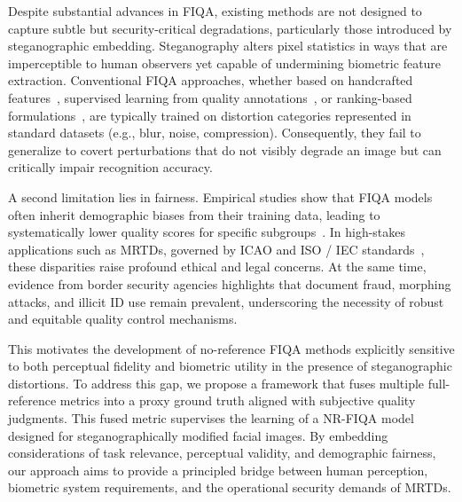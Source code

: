 Despite substantial advances in \acs{FIQA}, existing methods are not designed to capture subtle but security-critical degradations, particularly those introduced by steganographic embedding. Steganography alters pixel statistics in ways that are imperceptible to human observers yet capable of undermining biometric feature extraction. Conventional \acs{FIQA} approaches, whether based on handcrafted features~\cite{henniger2020assessment}, supervised learning from quality annotations~\cite{hernandez2019faceqnet, meng2021magface, terhorst2020serfiq}, or ranking-based formulations~\cite{liu2017rankiqa}, are typically trained on distortion categories represented in standard datasets (e.g., blur, noise, compression). Consequently, they fail to generalize to covert perturbations that do not visibly degrade an image but can critically impair recognition accuracy.

A second limitation lies in fairness. Empirical studies show that \acs{FIQA} models often inherit demographic biases from their training data, leading to systematically lower quality scores for specific subgroups~\cite{babnik2022bias}. In high-stakes applications such as \acs{MRTDs}, governed by \acs{ICAO} and \acs{ISO} / \acs{IEC} standards~\cite{icao2015, iso2010iec}, these disparities raise profound ethical and legal concerns. At the same time, evidence from border security agencies highlights that document fraud, morphing attacks, and illicit ID use remain prevalent, underscoring the necessity of robust and equitable quality control mechanisms.

This motivates the development of no-reference \acs{FIQA} methods explicitly sensitive to both perceptual fidelity and biometric utility in the presence of steganographic distortions. To address this gap, we propose a framework that fuses multiple full-reference metrics into a proxy ground truth aligned with subjective quality judgments. This fused metric supervises the learning of a \acf{NR-FIQA} model designed for steganographically modified facial images. By embedding considerations of task relevance, perceptual validity, and demographic fairness, our approach aims to provide a principled bridge between human perception, biometric system requirements, and the operational security demands of \acs{MRTDs}.

